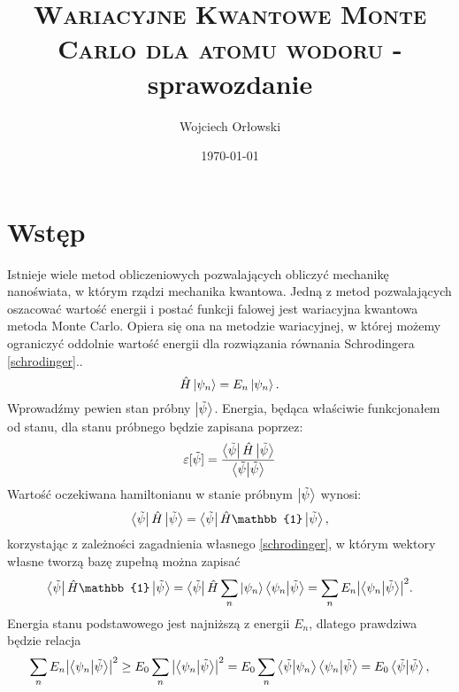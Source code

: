 \documentclass[12pt, a4paper]{article}
\author{Wojciech Orłowski}
\date{\today}
\title{\textsc{Wariacyjne Kwantowe Monte Carlo dla atomu wodoru} - sprawozdanie}
\begin{document}
    \maketitle

    \section*{Wstęp}

    Istnieje wiele metod obliczeniowych pozwalających obliczyć mechanikę nanoświata, w którym rządzi mechanika kwantowa.
    Jedną z metod pozwalających oszacować wartość energii i postać funkcji falowej jest wariacyjna kwantowa metoda Monte Carlo.
    Opiera się ona na metodzie wariacyjnej, w której możemy ograniczyć oddolnie wartość energii dla rozwiązania równania Schrodingera \eqref{schrodinger}..
    \begin{equation}
        \hat{H} \ket{\psi_n} = E_n \ket{\psi_n}.
        \label{schrodinger}
    \end{equation}
    Wprowadźmy pewien stan próbny $\ket{\tilde{\psi}}$.
    Energia, będąca właściwie funkcjonałem od stanu, dla stanu próbnego będzie zapisana poprzez:
    \begin{equation}
        \varepsilon[\tilde{\psi}] = \frac{\bra{\tilde{\psi}}\hat{H}\ket{\tilde{\psi}}}{\bra{\tilde{\psi}}\ket{\tilde{\psi}}}
    \end{equation}
    Wartość oczekiwana hamiltonianu w stanie próbnym $\ket{\tilde{\psi}}$ wynosi:
    \begin{equation}
        \bra{\tilde{\psi}} \hat{H} \ket{\tilde{\psi}} = \bra{\tilde{\psi}} \hat{H} \mathbb{1} \ket{\tilde{\psi}},
        \label{exp_value}
    \end{equation}
    korzystając z zależności zagadnienia własnego \eqref{schrodinger}, w którym wektory własne tworzą bazę zupełną można zapisać
    \begin{equation}
        \bra{\tilde{\psi}} \hat{H} \mathbb{1} \ket{\tilde{\psi}} = \bra{\tilde{\psi}} \hat{H} \sum_{n} \ket{\psi_n}\bra{\psi_n}  \ket{\tilde{\psi}}
        = \sum_n E_n \abs{\bra{\psi_n}\ket{\tilde{\psi}}}^2.
    \end{equation}
    Energia stanu podstawowego jest najniższą z energii $E_n$, dlatego prawdziwa będzie relacja
    \begin{equation}
        \sum_n E_n \abs{\bra{\psi_n}\ket{\tilde{\psi}}}^2 \geq E_0 \sum_n \abs{\bra{\psi_n}\ket{\tilde{\psi}}}^2 = E_0 \sum_n \bra{\tilde{\psi}}\ket{\psi_n}\bra{\psi_n}\ket{\tilde{\psi}} = E_0 \bra{\tilde{\psi}}\ket{\tilde{\psi}},
    \end{equation}
\end{document}
